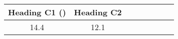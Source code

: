 \begin{tabular}{cccccccc}
{Heading C1 ()} & {Heading C2} \\ \midrule
{14.4} & {12.1} \\
\end{tabular}